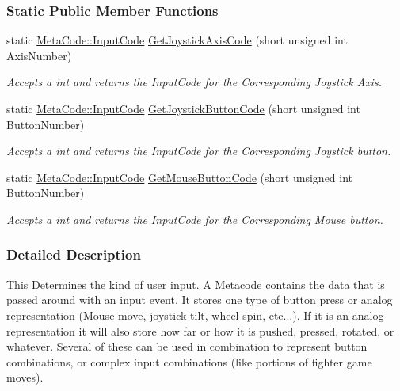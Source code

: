 \subsubsection*{Static Public Member Functions}
\begin{DoxyCompactItemize}
\item 
static \hyperlink{classphys_1_1MetaCode_a3e501cbb5bf0f6f1fdb7211465bda8d8}{MetaCode::InputCode} \hyperlink{classphys_1_1MetaCode_ac09685ca056e3c5423adeae712a3c436}{GetJoystickAxisCode} (short unsigned int AxisNumber)
\begin{DoxyCompactList}\small\item\em Accepts a int and returns the InputCode for the Corresponding Joystick Axis. \item\end{DoxyCompactList}\item 
static \hyperlink{classphys_1_1MetaCode_a3e501cbb5bf0f6f1fdb7211465bda8d8}{MetaCode::InputCode} \hyperlink{classphys_1_1MetaCode_a5e6e5f53b8c581b68a4b7e0a217032ca}{GetJoystickButtonCode} (short unsigned int ButtonNumber)
\begin{DoxyCompactList}\small\item\em Accepts a int and returns the InputCode for the Corresponding Joystick button. \item\end{DoxyCompactList}\item 
static \hyperlink{classphys_1_1MetaCode_a3e501cbb5bf0f6f1fdb7211465bda8d8}{MetaCode::InputCode} \hyperlink{classphys_1_1MetaCode_a4c5475be837b3ea5cc66223d53ca3e1a}{GetMouseButtonCode} (short unsigned int ButtonNumber)
\begin{DoxyCompactList}\small\item\em Accepts a int and returns the InputCode for the Corresponding Mouse button. \item\end{DoxyCompactList}\end{DoxyCompactItemize}


\subsubsection{Detailed Description}
This Determines the kind of user input. A Metacode contains the data that is passed around with an input event. It stores one type of button press or analog representation (Mouse move, joystick tilt, wheel spin, etc...). If it is an analog representation it will also store how far or how it is pushed, pressed, rotated, or whatever. Several of these can be used in combination to represent button combinations, or complex input combinations (like portions of fighter game moves). 

